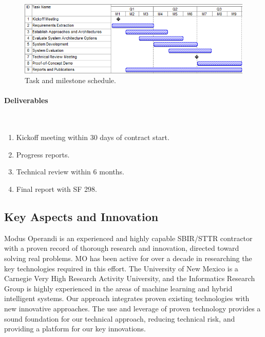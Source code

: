 \documentclass{sbir}
\begin{document}
\begin{figure}[h]
 \centerline{\includegraphics[width=5in]{./images/Gantt.png}}
 \caption{Task and milestone schedule.}
 \label{Gantt}
\end{figure}

\paragraph{Deliverables}~\\
\begin{enumerate}[label=\alph*.]
\item Kickoff meeting within 30 days of contract start.
\item Progress reports.
\item Technical review within 6 months.
\item Final report with SF 298.
\end{enumerate}


\newpage
\pagestyle{proprietary}

\subsection{Key Aspects and Innovation}
Modus Operandi is an experienced and highly capable SBIR/STTR contractor with a proven record of thorough research and innovation, directed toward solving real problems. MO has been active for over a decade in researching the key technologies required in this effort. The University of New Mexico is a Carnegie Very High Research Activity University, and the Informatics Research Group is highly experienced in the areas of machine learning and hybrid intelligent systems. Our approach integrates proven existing technologies with new innovative approaches. The use and leverage of proven technology provides a sound foundation for our technical approach, reducing technical risk, and providing a platform for our key innovations.
\end{document}
